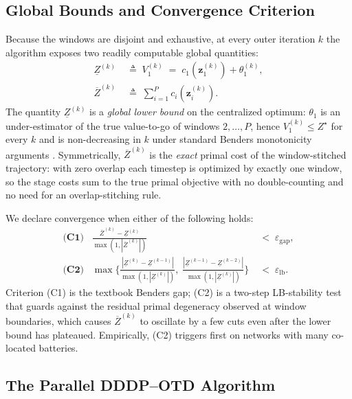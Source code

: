 \subsection{Global Bounds and Convergence Criterion}
\label{ssec:bounds}

Because the windows are disjoint and exhaustive, at every outer
iteration $k$ the algorithm exposes two readily computable global
quantities:
\begin{align}
\underline{Z}^{(k)} \;&\triangleq\; V_1^{(k)}
\;=\; c_1(\bm{z}_1^{(k)}) + \theta_1^{(k)},
\label{eq:LB}\\[2pt]
\overline{Z}^{(k)} \;&\triangleq\; \sum_{i=1}^{P} c_i(\bm{z}_i^{(k)}).
\label{eq:UB}
\end{align}
The quantity $\underline{Z}^{(k)}$ is a \emph{global lower bound} on
the centralized optimum: $\theta_1$ is an under-estimator of the
true value-to-go of windows $2,\dots,P$, hence
$V_1^{(k)}\!\le\!Z^\star$ for every $k$ and is non-decreasing in $k$
under standard Benders monotonicity arguments \cite{XX}. Symmetrically,
$\overline{Z}^{(k)}$ is the \emph{exact} primal cost of the
window-stitched trajectory: with zero overlap each timestep is
optimized by exactly one window, so the stage costs sum to the true
primal objective with no double-counting and no need for an
overlap-stitching rule.

We declare convergence when either of the following holds:
\begin{align}
\textbf{(C1)}\;\;\;
\frac{\overline{Z}^{(k)} - \underline{Z}^{(k)}}
     {\max(1,|\overline{Z}^{(k)}|)} &\;<\; \varepsilon_{\text{gap}},
\label{eq:cv_gap}\\[2pt]
\textbf{(C2)}\;\;\;
\max\!\Big\{\!
\tfrac{|\underline{Z}^{(k)}{-}\underline{Z}^{(k-1)}|}{\max(1,|\underline{Z}^{(k)}|)},\;
\tfrac{|\underline{Z}^{(k-1)}{-}\underline{Z}^{(k-2)}|}{\max(1,|\underline{Z}^{(k)}|)}\!
\Big\} &\;<\; \varepsilon_{\text{lb}}.
\label{eq:cv_lb}
\end{align}
Criterion (C1) is the textbook Benders gap; (C2) is a two-step
LB-stability test that guards against the residual primal degeneracy
observed at window boundaries, which causes $\overline{Z}^{(k)}$ to
oscillate by a few cuts even after the lower bound has plateaued.
Empirically, (C2) triggers first on networks with many co-located
batteries.

\subsection{The Parallel DDDP--OTD Algorithm}
\label{ssec:algorithm}

